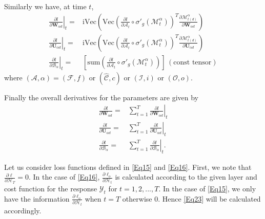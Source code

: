 \documentclass[journal]{IEEEtran}
\begin{document}
Similarly we have, at time $t$,
\begin{align}
\left.\frac{\partial l}{\partial \mathbf W_{\alpha d}}\right|_{t} =& \text{iVec}\left(\text{Vec}(\frac{\partial l}{\partial \mathcal{A}_t} \circ \sigma '_g(\mathcal{M}^{\alpha}_t))^T \frac{\partial \mathcal{M}^{\alpha}_{t(d)}}{\partial \mathbf W_{\alpha d}} \right) \label{Eq30}\\
\left.\frac{\partial l}{\partial \mathbf U_{\alpha d}}\right|_{t} =& \text{iVec}\left(\text{Vec}(\frac{\partial l}{\partial \mathcal{A}_t} \circ \sigma '_g(\mathcal{M}^{\alpha}_t))^T \frac{\partial \mathcal{M}^{\alpha}_{t(d)}}{\partial \mathbf U_{\alpha d}} \right) \label{Eq31}\\
\left.\frac{\partial l}{\partial \mathcal{B}_{\alpha}}\right|_{t} =& \left[\text{sum}\left(\frac{\partial l}{\partial \mathcal{A}_t} \circ \sigma '_g(\mathcal{M}^{\alpha}_t)\right)\right] \,(\text{const tensor}) \label{Eq32}
\end{align}
where $(\mathcal{A}, \alpha) = (\mathcal{F}, f)$ or $(\widehat{\mathcal{C}},c)$ or $(\mathcal{I}, i)$ or $(\mathcal{O}, o)$.

Finally the overall derivatives for the parameters are given by 
\begin{align}
 \frac{\partial l}{\partial \mathbf W_{\alpha d}} =& \sum^{T}_{t=1}\left.\frac{\partial l}{\partial \mathbf W_{\alpha d}}\right|_{t} \label{Eq33}\\
  \frac{\partial l}{\partial \mathbf U_{\alpha d}} =& \sum^{T}_{t=1}\left.\frac{\partial l}{\partial \mathbf U_{\alpha d}}\right|_{t} \label{Eq34}\\
   \frac{\partial l}{\partial \mathcal{B}_{\alpha}} =& \sum^{T}_{t=1}\left.\frac{\partial l}{\partial \mathcal{B}_{\alpha}}\right|_{t}. \label{Eq35}
\end{align}

Let us consider loss functions defined in \eqref{Eq15} and \eqref{Eq16}. First, we note that $\frac{\partial \ell}{\partial \mathcal{H}_T}=0$. In the case of \eqref{Eq16},   $\frac{\partial \ell_o}{\partial \mathcal{H}_t}$ is calculated according to the given layer and cost function for the response $\mathcal{Y}_t$ for $t=1, 2, ..., T$. In the case of \eqref{Eq15}, we only have the information $\frac{\partial \ell_o}{\partial \mathcal{H}_t}$ when $t=T$ otherwise 0. Hence \eqref{Eq23} will be calculated accordingly.  
\end{document}
